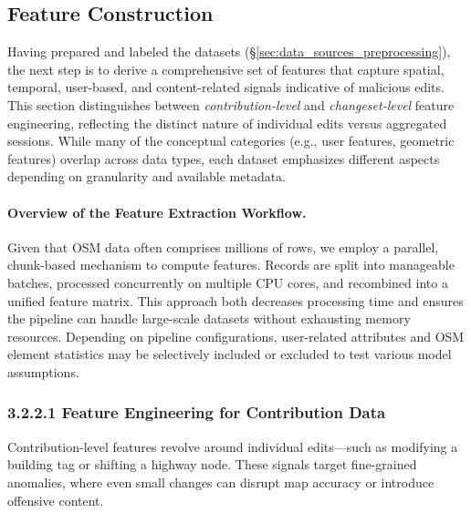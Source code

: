 \documentclass[
    13pt, %
    a4paper, %
    DIV14, %
    listof=totoc, %
    bibliography=totoc, %
    index=totoc, %
    headsepline
]{scrreprt}
\begin{document}
\subsection{Feature Construction}
\label{sec:feature_construction}

Having prepared and labeled the datasets (\S\ref{sec:data_sources_preprocessing}), the next step is to derive a comprehensive set of features that capture spatial, temporal, user-based, and content-related signals indicative of malicious edits. This section distinguishes between \emph{contribution-level} and \emph{changeset-level} feature engineering, reflecting the distinct nature of individual edits versus aggregated sessions. While many of the conceptual categories (e.g., user features, geometric features) overlap across data types, each dataset emphasizes different aspects depending on granularity and available metadata.

\paragraph{Overview of the Feature Extraction Workflow.}
Given that OSM data often comprises millions of rows, we employ a parallel, chunk-based mechanism to compute features. Records are split into manageable batches, processed concurrently on multiple CPU cores, and recombined into a unified feature matrix. This approach both decreases processing time and ensures the pipeline can handle large-scale datasets without exhausting memory resources. Depending on pipeline configurations, user-related attributes and OSM element statistics may be selectively included or excluded to test various model assumptions.


\subsubsection{3.2.2.1 Feature Engineering for Contribution Data}
\label{sec:feature_contribution}

Contribution-level features revolve around individual edits—such as modifying a building tag or shifting a highway node. These signals target fine-grained anomalies, where even small changes can disrupt map accuracy or introduce offensive content.
\end{document}
